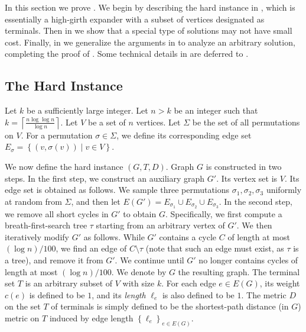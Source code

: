 \documentclass[11pt]{article}
\theoremstyle{definition}
\newcommand{\set}[1]{\left\{ #1 \right\}}
\def\ceil#1{\left\lceil #1 \right\rceil}
\newcounter{note}
\begin{document}
\begin{titlepage}
In this section we prove . We begin by describing the hard instance in , which is essentially a high-girth expander with a subset of vertices designated as terminals. Then in  we show that a special type of solutions may not have small cost. Finally, in  we generalize the arguments in  to analyze an arbitrary solution, completing the proof of . Some technical details in  are deferred to .



\subsection{The Hard Instance}
\label{subsec: instance}

Let $k$ be a sufficiently large integer.
Let $n>k$ be an integer such that $k=\ceil{\frac{n\log \log n}{\log n}}$.
Let $V$ be a set of $n$ vertices.
Let $\Sigma$ be the set of all permutations on $V$. For a permutation $\sigma\in \Sigma$, we define its corresponding edge set $E_{\sigma}=\set{(v,\sigma(v))\mid v\in V}$.

We now define the hard instance $(G,T,D)$. 
Graph $G$ is constructed in two steps. In the first step, we construct an auxiliary graph $G'$.
Its vertex set is $V$. Its edge set is obtained as follows. We sample three permutations $\sigma_1,\sigma_2,\sigma_3$ uniformly at random from $\Sigma$, and then let $E(G')=E_{\sigma_1}\cup E_{\sigma_2}\cup E_{\sigma_3}$.
In the second step, we remove all short cycles in $G'$ to obtain $G$.
%
Specifically, we first compute a breath-first-search tree $\tau$ starting from an arbitrary vertex of $G'$.
We then iteratively modify $G'$ as follows.
While $G'$ contains a cycle $C$ of length at most $(\log n)/100$, we find an edge of $C\setminus \tau$ (note that such an edge must exist, as $\tau$ is a tree), and remove it from $G'$. We continue until $G'$ no longer contains cycles of length at most $(\log n)/100$. We denote by $G$ the resulting graph.
%
The terminal set $T$ is an arbitrary subset of $V$ with size $k$. For each edge $e\in E(G)$, its weight $c(e)$ is defined to be $1$, and its \emph{length} $\ell_e$ is also defined to be $1$. The metric $D$ on the set $T$ of terminals is simply defined to be the shortest-path distance (in $G$) metric on $T$ induced by edge length $\set{\ell_e}_{e\in E(G)}$.




\end{titlepage}
\end{document}
